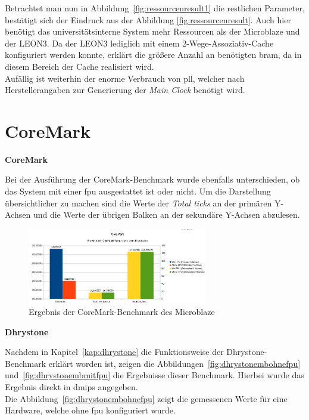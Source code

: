 Betrachtet man nun in Abbildung~\ref{fig:ressourcenresult1} die restlichen Parameter, bestätigt sich der Eindruck aus der Abbildung
\ref{fig:ressourcenresult}. Auch hier benötigt das universitätsinterne System mehr Ressourcen als der Microblaze und der LEON3.
Da der LEON3 lediglich mit einem 2-Wege-Assoziativ-Cache konfiguriert werden konnte, erklärt die größere Anzahl an
benötigten \ac{bram}, da in diesem Bereich der Cache realisiert wird.\\
Aufällig ist weiterhin der enorme Verbrauch von \ac{pll}, welcher nach Herstellerangaben zur Generierung der \emph{Main Clock}
benötigt wird.\\

\section{CoreMark}\label{kap:coremark}


\textbf{CoreMark}

Bei der Ausführung der CoreMark-Benchmark wurde ebenfalls unterschieden, ob das System mit einer \ac{fpu} ausgestattet ist oder nicht.
Um die Darstellung übersichtlicher zu machen sind die Werte der \emph{Total ticks} an der primären Y-Achsen und die Werte der übrigen Balken an der sekundäre Y-Achsen abzulesen.\\

\begin{figure}[H]
\centering
\includegraphics[width=0.7\textwidth]{Hauptteil/coremarkmb.png}
\caption{Ergebnis der CoreMark-Benchmark des Microblaze}
\label{fig:coremarkmb}
\end{figure}

\textbf{Dhrystone}

Nachdem in Kapitel~\ref{kap:dhrystone} die Funktionsweise der Dhrystone-Benchmark erklärt worden ist, zeigen die Abbildungen~\ref{fig:dhrystonembohnefpu} und~\ref{fig:dhrystonembmitfpu} die Ergebnisse dieser Benchmark.
Hierbei wurde das Ergebnis direkt in \ac{dmips} angegeben.\\
Die Abbildung~\ref{fig:dhrystonembohnefpu} zeigt die gemessenen Werte für eine Hardware, welche ohne \ac{fpu} konfiguriert wurde.

